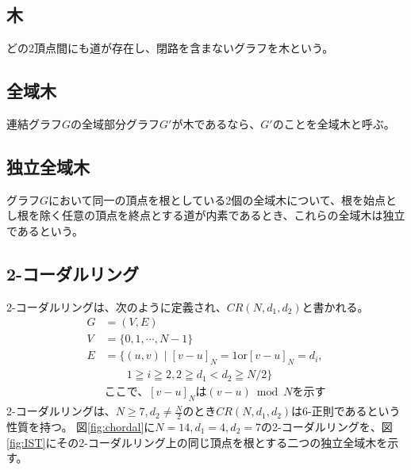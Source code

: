 \documentclass[twocolumn, 11pt]{jsarticle}
\begin{document}
    \subsection{木}
        どの2頂点間にも道が存在し、閉路を含まないグラフを木という。

    \subsection{全域木}
        連結グラフ$G$の全域部分グラフ$G'$が木であるなら、$G'$のことを全域木と呼ぶ。\cite{2006離散数学入門}

    \subsection{独立全域木}
        グラフ$G$において同一の頂点を根としている2個の全域木について、根を始点とし根を除く任意の頂点を終点とする道が内素であるとき、これらの全域木は独立であるという。\cite{chartrand1993applied}

    \subsection{2-コーダルリング}
        2-コーダルリングは、次のように定義され、$CR(N, d_1, d_2)$と書かれる。\cite{YukihiroHAMADA2016}
        \begin{equation*}
            \begin{split}
                G &= (V, E) \\
                V &= \{0, 1, \cdots, N-1\} \\
                E &= \{(u, v) \mid [v-u]_N = 1 \text{or} [v-u]_N = d_i, \\
                  &\qquad 1 \geqq i \geqq 2, 2 \geqq d_1 < d_2 \geqq N/2\} \\
                  &\text{ここで、}[v-u]_N \text{は} (v-u) \bmod N \text{を示す}
            \end{split}
        \end{equation*}
        2-コーダルリングは、$N\geq7, d_2\neq\frac{N}{2}$のとき$CR(N,d_1,d_2)$は6-正則であるという性質を持つ。
        図\ref{fig:chordal}に$N = 14, d_1 = 4, d_2 = 7$の2-コーダルリングを、図\ref{fig:IST}にその2-コーダルリング上の同じ頂点を根とする二つの独立全域木を示す。
      
\end{document}
